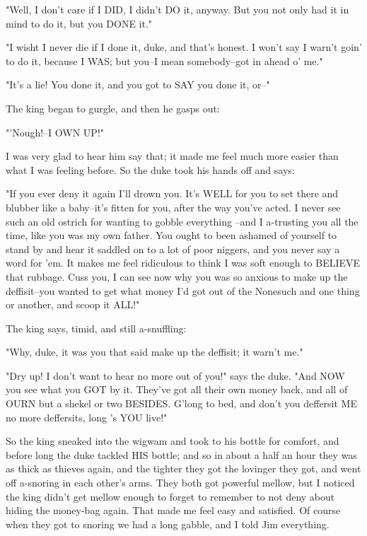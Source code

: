 "Well, I don't care if I DID, I didn't DO it, anyway.  But you not only
had it in mind to do it, but you DONE it."

"I wisht I never die if I done it, duke, and that's honest.  I won't say
I warn't goin' to do it, because I WAS; but you--I mean somebody--got in
ahead o' me."

"It's a lie!  You done it, and you got to SAY you done it, or--"

The king began to gurgle, and then he gasps out:

"'Nough!--I OWN UP!"

I was very glad to hear him say that; it made me feel much more easier
than what I was feeling before.  So the duke took his hands off and says:

"If you ever deny it again I'll drown you.  It's WELL for you to set
there and blubber like a baby--it's fitten for you, after the way you've
acted. I never see such an old ostrich for wanting to gobble everything
--and I a-trusting you all the time, like you was my own father.  You ought
to been ashamed of yourself to stand by and hear it saddled on to a lot
of poor niggers, and you never say a word for 'em.  It makes me feel
ridiculous to think I was soft enough to BELIEVE that rubbage.  Cuss you,
I can see now why you was so anxious to make up the deffisit--you wanted
to get what money I'd got out of the Nonesuch and one thing or another,
and scoop it ALL!"

The king says, timid, and still a-snuffling:

"Why, duke, it was you that said make up the deffisit; it warn't me."

"Dry up!  I don't want to hear no more out of you!" says the duke.  "And
NOW you see what you GOT by it.  They've got all their own money back,
and all of OURN but a shekel or two BESIDES.  G'long to bed, and don't
you deffersit ME no more deffersits, long 's YOU live!"

So the king sneaked into the wigwam and took to his bottle for comfort,
and before long the duke tackled HIS bottle; and so in about a half an
hour they was as thick as thieves again, and the tighter they got the
lovinger they got, and went off a-snoring in each other's arms.  They
both got powerful mellow, but I noticed the king didn't get mellow enough
to forget to remember to not deny about hiding the money-bag again.  That
made me feel easy and satisfied.  Of course when they got to snoring we
had a long gabble, and I told Jim everything.




